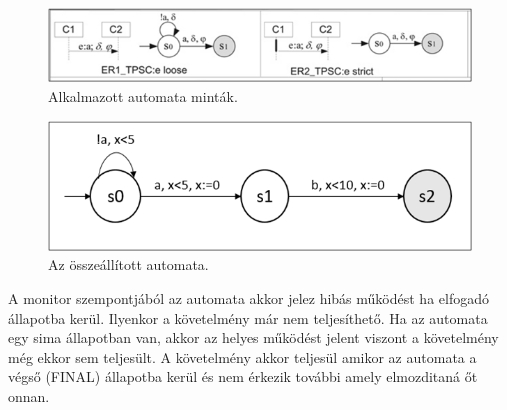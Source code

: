 \begin{figure}[!ht]
    \centering
    \includegraphics[width=150mm, keepaspectratio]{figures/8abra.png}
    \caption{Alkalmazott automata minták.}
\end{figure}

\begin{figure}[!ht]
    \centering
    \includegraphics[width=130mm, keepaspectratio]{figures/9abra.png}
    \caption{Az összeállított automata.}
\end{figure}

A monitor szempontjából az automata akkor jelez hibás működést ha elfogadó állapotba kerül.
Ilyenkor a követelmény már nem teljesíthető.
Ha az automata egy sima állapotban van, akkor az helyes működést jelent viszont a követelmény még ekkor sem teljesült.
A követelmény akkor teljesül amikor az automata a végső (FINAL) állapotba kerül és nem érkezik további amely elmozditaná őt onnan.